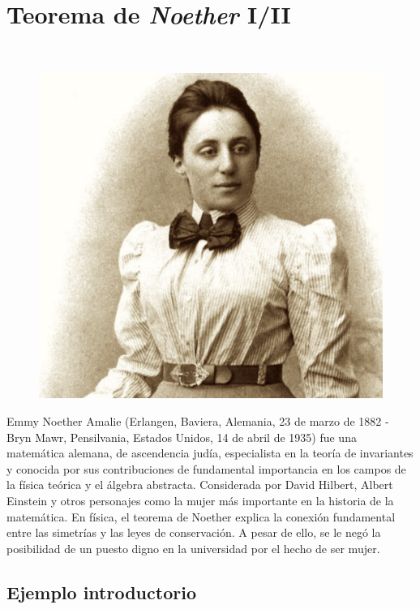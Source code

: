 \chapter{Teorema de \emph{Noether} I/II}
\label{NoeterIdeII}




\vspace{10mm}
\begin{adjustwidth}{50pt}{50pt}
\begin{ejemplo}
\begin{multicols}{2}

$\,$

\begin{figure}[H]
	\centering
	\includegraphics[width=.4\textwidth]{imagenes/img14-01.png}
\end{figure}
Emmy Noether Amalie (Erlangen, Baviera, Alemania, 23 de marzo de 1882 - Bryn Mawr, Pensilvania, Estados Unidos, 14 de abril de 1935) fue una matemática alemana, de ascendencia judía, especialista en la teoría de invariantes y conocida por sus contribuciones de fundamental importancia en los campos de la física teórica y el álgebra abstracta. Considerada por David Hilbert, Albert Einstein y otros personajes como la mujer más importante en la historia de la matemática. En física, el teorema de Noether explica la conexión fundamental entre las simetrías y las leyes de conservación. A pesar de ello, se le negó la posibilidad de un puesto digno en la universidad por el hecho de ser mujer.
\end{multicols}
\end{ejemplo}
\end{adjustwidth}
\vspace{5mm}

\section{Ejemplo introductorio}

